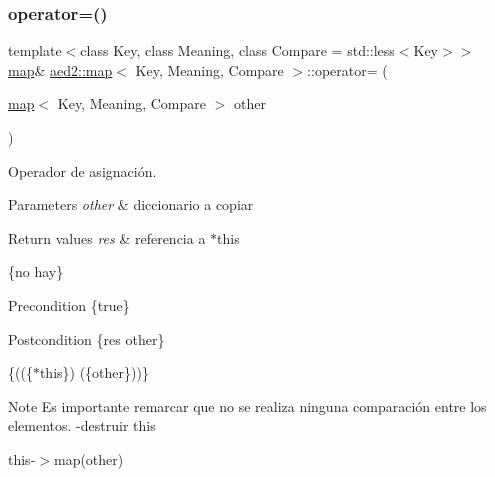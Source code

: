 \subsubsection{\texorpdfstring{operator=()}{operator=()}\hspace{0.1cm}{\footnotesize\ttfamily [1/2]}}
{\footnotesize\ttfamily template$<$class Key, class Meaning, class Compare = std\+::less$<$\+Key$>$$>$ \\
\hyperlink{classaed2_1_1map}{map}\& \hyperlink{classaed2_1_1map}{aed2\+::map}$<$ Key, Meaning, Compare $>$\+::operator= (\begin{DoxyParamCaption}\item[{\hyperlink{classaed2_1_1map}{map}$<$ Key, Meaning, Compare $>$}]{other }\end{DoxyParamCaption})\hspace{0.3cm}{\ttfamily [inline]}}



Operador de asignación. 


\begin{DoxyParams}{Parameters}
{\em other} & diccionario a copiar \\
\hline
\end{DoxyParams}

\begin{DoxyRetVals}{Return values}
{\em res} & referencia a $\ast$this\\
\hline
\end{DoxyRetVals}
\{no hay\}

\begin{DoxyPrecond}{Precondition}
\{true\} 
\end{DoxyPrecond}
\begin{DoxyPostcond}{Postcondition}
\{res  other\}
\end{DoxyPostcond}
\{((\{$\ast$this\})  (\{other\}))\}

\begin{DoxyNote}{Note}
Es importante remarcar que no se realiza ninguna comparación entre los elementos. -\/destruir this
\begin{DoxyItemize}
\item this-\/$>$map(other) 
\end{DoxyItemize}
\end{DoxyNote}
\mbox{\label{classaed2_1_1map_ac606d334809066929522964d45e76317}} 
